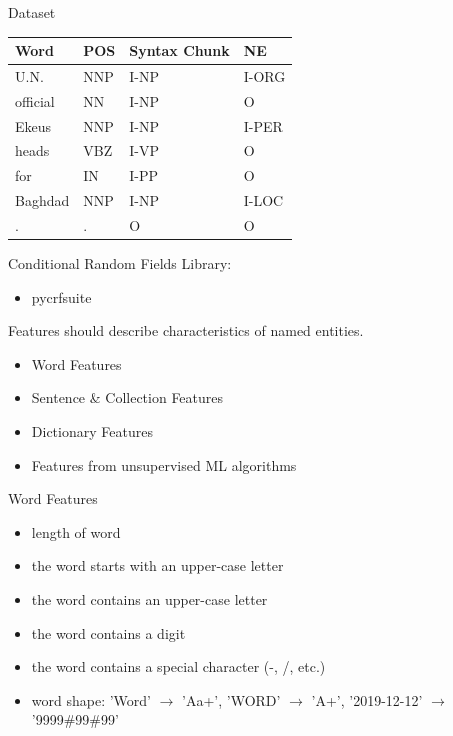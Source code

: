 \documentclass[12pt, tikz]{beamer}
\begin{document}
\begin{frame}[fragile]{Dataset}
	\begin{center}
		\begin{tabular}{l | l | l | l}
			Word & POS & Syntax Chunk & NE \\
			\hline
			U.N. & NNP & I-NP & I-ORG 
\\
			official & NN & I-NP & O 
\\
			Ekeus & NNP & I-NP & I-PER \\ 
			heads & VBZ & I-VP & O 
\\
			for & IN & I-PP & O \\
			Baghdad & NNP & I-NP & I-LOC \\ 
			. & . & O & O \\
		\end{tabular}
	\end{center}
\end{frame}

\begin{frame}[fragile]{Conditional Random Fields}
	Library:
	\begin{itemize}
		\item pycrfsuite
	\end{itemize}

	Features should describe characteristics of named entities.
	
	\begin{itemize}
		\item Word Features
		\item Sentence \& Collection Features
		\item Dictionary Features
		\item Features from unsupervised ML algorithms
	\end{itemize}
\end{frame}

\begin{frame}[fragile]{Word Features}
	\begin{itemize}
		\item length of word
		\item the word starts with an upper-case letter
		\item the word contains an upper-case letter
		\item the word contains a digit
		\item the word contains a special character (-, /, etc.)
		\item word shape: 'Word' $\rightarrow$ 'Aa+', 'WORD' $\rightarrow$ 'A+', '2019-12-12' $\rightarrow$ '9999\#99\#99'
	\end{itemize}
\end{frame}
\end{document}
